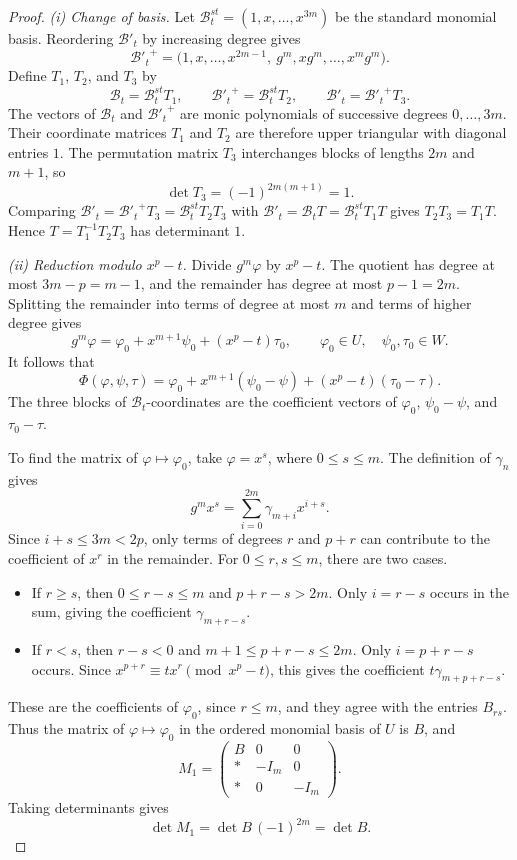 \documentclass{amsart}
\numberwithin{equation}{section}
\begin{document}
\begin{proof}
\emph{(i) Change of basis.}
Let $\mathcal B_t^{st}=(1,x,\ldots,x^{3m})$ be the standard
monomial basis. Reordering $\mathcal B'_t$ by increasing
degree gives
\[
  {\mathcal B'_t}^+
  =\bigl(1,x,\ldots,x^{2m-1},\
         g^m,xg^m,\ldots,x^mg^m\bigr).
\]
Define $T_1$, $T_2$, and $T_3$ by
\[
  \mathcal B_t=\mathcal B_t^{st}T_1,
  \qquad
  {\mathcal B'_t}^+=\mathcal B_t^{st}T_2,
  \qquad
  \mathcal B'_t={\mathcal B'_t}^+ T_3.
\]
The vectors of $\mathcal B_t$ and ${\mathcal B'_t}^+$
are monic polynomials of successive degrees $0,\ldots,3m$.
Their coordinate matrices $T_{1}$ and
$T_{2}$ are therefore upper triangular with
diagonal entries $1$. The permutation matrix $T_3$
interchanges blocks of lengths $2m$ and $m+1$, so
\[
  \det T_3=(-1)^{2m(m+1)}=1.
\]
Comparing $\mathcal B'_t = {\mathcal B'_t}^+ T_3 = \mathcal B_t^{st}T_2T_3$ 
with $\mathcal B'_t=\mathcal B_t T = \mathcal B_t^{st}T_1 T$ gives $T_2T_3 = T_1 T$. Hence $T=T_1^{-1}T_2T_3$ has determinant $1$.

\emph{(ii) Reduction modulo $x^p-t$.}
Divide $g^m\varphi$ by $x^p-t$. The quotient has degree at most
$3m-p=m-1$, and the remainder has degree at most
$p-1=2m$. Splitting the remainder into terms of degree
at most $m$ and terms of higher degree gives
\[
  g^m \varphi=\varphi_0+x^{m+1}\psi_0+(x^p-t)\tau_0,
  \qquad \varphi_0\in U,\quad \psi_0,\tau_0\in W.
\]
It follows that
\[
  \Phi(\varphi,\psi,\tau)
    =\varphi_0+x^{m+1}(\psi_0-\psi)+(x^p-t)(\tau_0-\tau).
\]
The three blocks of $\mathcal B_t$-coordinates are the
coefficient vectors of $\varphi_0$, $\psi_0-\psi$, and $\tau_0-\tau$.

To find the matrix of $\varphi\mapsto \varphi_0$, take $\varphi=x^s$,
where $0\le s\le m$. The definition of $\gamma_n$ gives
\[
  g^mx^s=\sum_{i=0}^{2m}\gamma_{m+i}x^{i+s}.
\]
Since $i+s\le 3m<2p$, only terms of degrees $r$ and
$p+r$ can contribute to the coefficient of $x^r$ in
the remainder. For $0\le r,s\le m$, there are two cases.

\begin{itemize}
  \item If $r\ge s$, then $0\le r-s\le m$ and
    $p+r-s>2m$. Only $i=r-s$ occurs in the sum, giving
    the coefficient $\gamma_{m+r-s}$.
  \item If $r<s$, then $r-s<0$ and
    $m+1\le p+r-s\le 2m$. Only $i=p+r-s$ occurs.
    Since $x^{p+r}\equiv tx^r\pmod{x^p-t}$, this
    gives the coefficient $t\gamma_{m+p+r-s}$.
\end{itemize}

These are the coefficients of $\varphi_0$, since $r\le m$,
and they agree with the entries $B_{rs}$. Thus the matrix
of $\varphi\mapsto \varphi_0$ in the ordered monomial basis of $U$
is $B$, and
\[
  M_1=
  \begin{pmatrix}
    B & 0 & 0\\
    * & -I_m & 0\\
    * & 0 & -I_m
  \end{pmatrix}.
\]
Taking determinants gives
\begin{equation}\label{eq_phi-b}
  \det M_1=\det B\,(-1)^{2m}=\det B.
\end{equation}
\end{proof}
\end{document}
